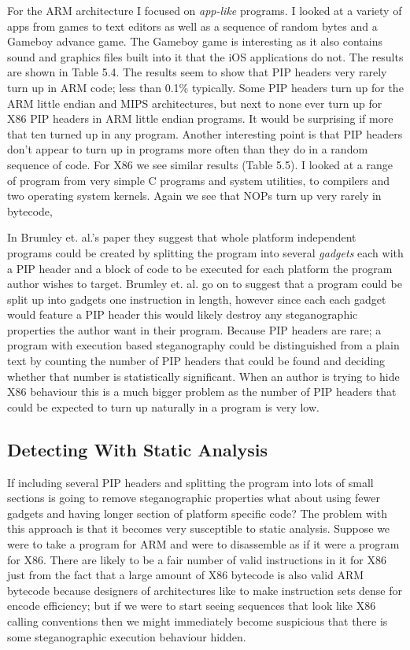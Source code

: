 \documentclass[10pt,]{book}
\begin{document}
For the ARM architecture I focused on \emph{app-like} programs. I looked
at a variety of apps from games to text editors as well as a sequence of
random bytes and a Gameboy advance game. The Gameboy game is interesting
as it also contains sound and graphics files built into it that the iOS
applications do not. The results are shown in Table 5.4. The results
seem to show that PIP headers very rarely turn up in ARM code; less than
0.1\% typically. Some PIP headers turn up for the ARM little endian and
MIPS architectures, but next to none ever turn up for X86 PIP headers in
ARM little endian programs. It would be surprising if more that ten
turned up in any program. Another interesting point is that PIP headers
don't appear to turn up in programs more often than they do in a random
sequence of code. For X86 we see similar results (Table 5.5). I looked
at a range of program from very simple C programs and system utilities,
to compilers and two operating system kernels. Again we see that NOPs
turn up very rarely in bytecode,

In Brumley et. al.'s paper\autocite{Cha:2010uh} they suggest that whole
platform independent programs could be created by splitting the program
into several \emph{gadgets} each with a PIP header and a block of code
to be executed for each platform the program author wishes to target.
Brumley et. al. go on to suggest that a program could be split up into
gadgets one instruction in length, however since each each gadget would
feature a PIP header this would likely destroy any steganographic
properties the author want in their program. Because PIP headers are
rare; a program with execution based steganography could be
distinguished from a plain text by counting the number of PIP headers
that could be found and deciding whether that number is statistically
significant. When an author is trying to hide X86 behaviour this is a
much bigger problem as the number of PIP headers that could be expected
to turn up naturally in a program is very low.

\subsection{Detecting With Static Analysis}

If including several PIP headers and splitting the program into lots of
small sections is going to remove steganographic properties what about
using fewer gadgets and having longer section of platform specific code?
The problem with this approach is that it becomes very susceptible to
static analysis. Suppose we were to take a program for ARM and were to
disassemble as if it were a program for X86. There are likely to be a
fair number of valid instructions in it for X86 just from the fact that
a large amount of X86 bytecode is also valid ARM bytecode because
designers of architectures like to make instruction sets dense for
encode efficiency; but if we were to start seeing sequences that look
like X86 calling conventions then we might immediately become suspicious
that there is some steganographic execution behaviour hidden.
\end{document}
